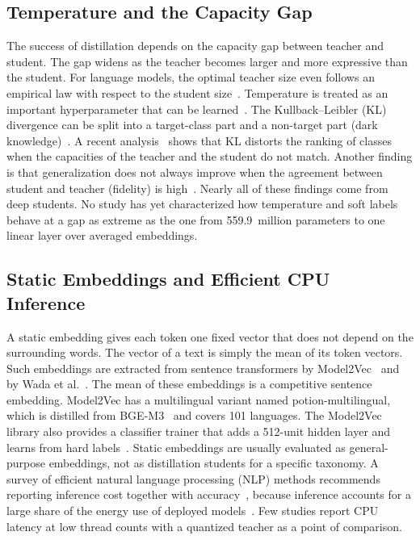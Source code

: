 \documentclass[journal]{IEEEtran}
\begin{document}
\subsection{Temperature and the Capacity Gap}
The success of distillation depends on the capacity gap between teacher and student. The gap widens as the teacher becomes larger and more expressive than the student. For language models, the optimal teacher size even follows an empirical law with respect to the student size~\cite{zhang2025law}. Temperature is treated as an important hyperparameter that can be learned~\cite{li2023ctkd}. The Kullback--Leibler (KL) divergence can be split into a target-class part and a non-target part (dark knowledge)~\cite{zhao2022dkd}. A recent analysis~\cite{wang2026rckd} shows that KL distorts the ranking of classes when the capacities of the teacher and the student do not match. Another finding is that generalization does not always improve when the agreement between student and teacher (fidelity) is high~\cite{stanton2021kd}. Nearly all of these findings come from deep students. No study has yet characterized how temperature and soft labels behave at a gap as extreme as the one from 559.9~million parameters to one linear layer over averaged embeddings.

\subsection{Static Embeddings and Efficient CPU Inference}
A static embedding gives each token one fixed vector that does not depend on the surrounding words. The vector of a text is simply the mean of its token vectors. Such embeddings are extracted from sentence transformers by Model2Vec~\cite{tulkens2024model2vec} and by Wada et al.~\cite{wada2025static}. The mean of these embeddings is a competitive sentence embedding. Model2Vec has a multilingual variant named potion-multilingual, which is distilled from BGE-M3~\cite{chen2024bgem3} and covers 101 languages. The Model2Vec library also provides a classifier trainer that adds a 512-unit hidden layer and learns from hard labels~\cite{tulkens2024model2vec}. Static embeddings are usually evaluated as general-purpose embeddings, not as distillation students for a specific taxonomy. A survey of efficient natural language processing (NLP) methods recommends reporting inference cost together with accuracy~\cite{treviso2023efficient}, because inference accounts for a large share of the energy use of deployed models~\cite{luccioni2024power}. Few studies report CPU latency at low thread counts with a quantized teacher as a point of comparison.
\end{document}
